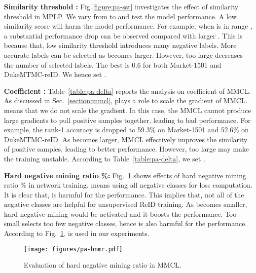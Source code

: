 \documentclass[10pt,twocolumn,letterpaper]{article}
\begin{document}
\textbf{Similarity threshold :} Fig.\ref{figure:pa-sst} investigates the effect of similarity threshold  in MPLP. We vary  from  to  and test the model performance. A low similarity score  will harm the model performance. For example, when  is in range , a substantial performance drop can be observed compared with larger . This is because that, low similarity threshold introduces many negative labels. More accurate labels can be selected as  becomes larger. However, too large  decreases the number of selected labels. The best  is 0.6 for both Market-1501 and DukeMTMC-reID. We hence set .


\textbf{Coefficient :} Table~\ref{table:pa-delta} reports the analysis on coefficient  of MMCL. As discussed in Sec.~\ref{section:mmcl},  plays a role to scale the gradient of MMCL.  means that we do not scale the gradient. In this case, the MMCL cannot produce large gradients to pull positive samples together, leading to bad performance. For example, the rank-1 accuracy is dropped to 59.3\% on Market-1501 and 52.6\% on DukeMTMC-reID. As  becomes larger, MMCL effectively improves the similarity of positive samples, leading to better performance. However, too large  may make the training unstable. According to Table~\ref{table:pa-delta}, we set .

\textbf{Hard negative mining ratio \%:} Fig.~\ref{figure:pa-hnmr} shows effects of hard negative mining ratio \% in network training.  means using all negative classes for loss computation. It is clear that,  is harmful for the performance. This implies that, not all of the negative classes are helpful for unsupervised ReID training. As  becomes smaller, hard negative mining would be activated and it boosts the performance. Too small  selects too few negative classes, hence is also harmful for the performance. According to Fig.~\ref{figure:pa-hnmr},  is used in our experiments.

\begin{figure}
\begin{center}
\texttt{[image: figures/pa-hnmr.pdf]}
\end{center}
\vspace{-2mm}
\caption{Evaluation of hard negative mining ratio  in MMCL.}
\label{figure:pa-hnmr}
\end{figure}
\end{document}

